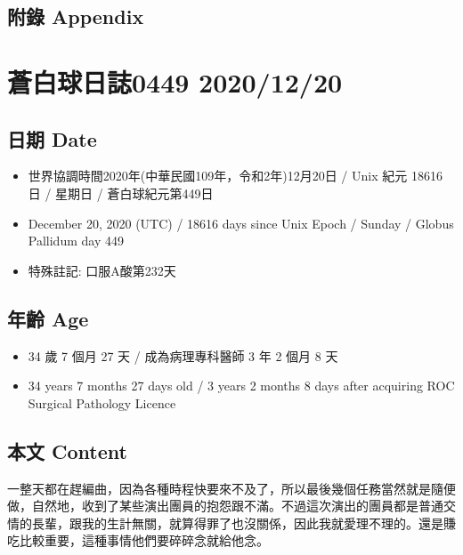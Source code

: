 \documentclass[a5paper, 10pt
]{book}
\providecommand{\tightlist}{%
  \setlength{\itemsep}{0pt}\setlength{\parskip}{0pt}}
\begin{document}
\hypertarget{ux9644ux9304-appendix-18}{%
\subsection{附錄 Appendix}\label{ux9644ux9304-appendix-18}}

\hypertarget{ux84bcux767dux7403ux65e5ux8a8c0449-20201220}{%
\section{蒼白球日誌0449
2020/12/20}\label{ux84bcux767dux7403ux65e5ux8a8c0449-20201220}}

\hypertarget{ux65e5ux671f-date-19}{%
\subsection{日期 Date}\label{ux65e5ux671f-date-19}}

\begin{itemize}
\tightlist
\item
  世界協調時間2020年(中華民國109年，令和2年)12月20日 / Unix 紀元 18616
  日 / 星期日 / 蒼白球紀元第449日
\item
  December 20, 2020 (UTC) / 18616 days since Unix Epoch / Sunday /
  Globus Pallidum day 449
\item
  特殊註記: 口服A酸第232天
\end{itemize}

\hypertarget{ux5e74ux9f61-age-19}{%
\subsection{年齡 Age}\label{ux5e74ux9f61-age-19}}

\begin{itemize}
\tightlist
\item
  34 歲 7 個月 27 天 / 成為病理專科醫師 3 年 2 個月 8 天
\item
  34 years 7 months 27 days old / 3 years 2 months 8 days after
  acquiring ROC Surgical Pathology Licence
\end{itemize}

\hypertarget{ux672cux6587-content-19}{%
\subsection{本文 Content}\label{ux672cux6587-content-19}}

一整天都在趕編曲，因為各種時程快要來不及了，所以最後幾個任務當然就是隨便做，自然地，收到了某些演出團員的抱怨跟不滿。不過這次演出的團員都是普通交情的長輩，跟我的生計無關，就算得罪了也沒關係，因此我就愛理不理的。還是賺吃比較重要，這種事情他們要碎碎念就給他念。
\end{document}
